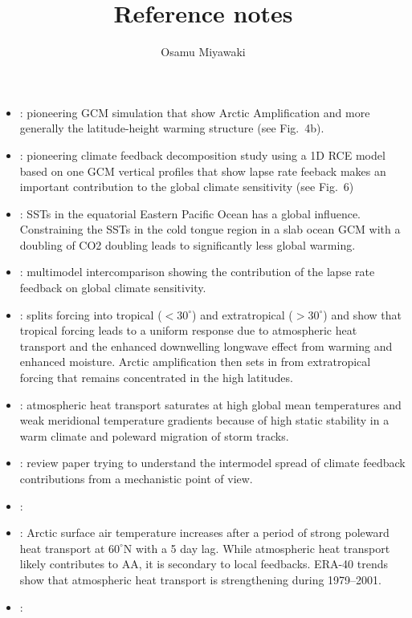 \documentclass{article}
\title{Reference notes}
\author{Osamu Miyawaki}
\begin{document}
\maketitle

\begin{itemize}
\item \textbf{\cite{manabe1975}}: pioneering GCM simulation that show Arctic Amplification and more generally the latitude-height warming structure (see Fig.~4b).
\item \textbf{\cite{hansen1984}}: pioneering climate feedback decomposition study using a 1D RCE model based on one GCM vertical profiles that show lapse rate feeback makes an important contribution to the global climate sensitivity (see Fig.~6)
\item \textbf{\cite{schneider1997}}: SSTs in the equatorial Eastern Pacific Ocean has a global influence. Constraining the SSTs in the cold tongue region in a slab ocean GCM with a doubling of CO2 doubling leads to significantly less global warming.
\item \textbf{\cite{colman2003}}: multimodel intercomparison showing the contribution of the lapse rate feedback on global climate sensitivity.
\item \textbf{\cite{alexeev2005}}: splits forcing into tropical ($<30^\circ$) and extratropical ($>30^\circ$) and show that tropical forcing leads to a uniform response due to atmospheric heat transport and the enhanced downwelling longwave effect from warming and enhanced moisture. Arctic amplification then sets in from extratropical forcing that remains concentrated in the high latitudes.
\item \textbf{\cite{caballero2005}}: atmospheric heat transport saturates at high global mean temperatures and weak meridional temperature gradients because of high static stability in a warm climate and poleward migration of storm tracks.
\item \textbf{\cite{bony2006}}: review paper trying to understand the intermodel spread of climate feedback contributions from a mechanistic point of view.
\item \textbf{\cite{francis2006}}:
\item \textbf{\cite{graversen2006}}: Arctic surface air temperature increases after a period of strong poleward heat transport at $60^\circ$N with a 5 day lag. While atmospheric heat transport likely contributes to AA, it is secondary to local feedbacks. ERA-40 trends show that atmospheric heat transport is strengthening during 1979--2001. 
\item \textbf{\cite{sorteberg2008}}:

\end{itemize}
\end{document}
